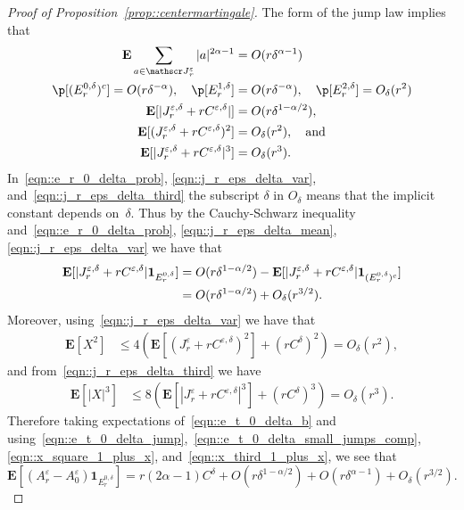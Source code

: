 \documentclass[10pt]{amsart}
\let\mathcal\mathscr
\let\epsilon\varepsilon
\theoremstyle{plain}
\numberwithin{theorem}{section}
\theoremstyle{definition}
\newcommand{\CJ}{{\mathcal J}}
\newcommand \E {{\mathbf E}}
\newcommand{\one}{{\mathbf 1}}
\begin{document}
\begin{proof}[Proof of Proposition~\ref{prop::centermartingale}]
The form of the jump law implies that
\begin{align}
\E \sum_{a \in \CJ_r^\epsilon} |a|^{2\alpha-1} &= O( r \delta^{\alpha-1}) \label{eqn::e_t_0_delta_jump}\\
\p[(E_r^{0,\delta})^c] = O(r \delta^{-\alpha}),\quad \p[E_r^{1,\delta}] &= O(r \delta^{-\alpha}),\quad \p[ E_r^{2,\delta}] = O_\delta(r^2) \label{eqn::e_r_0_delta_prob}\\
\E[ |J_r^{\epsilon,\delta} + r C^{\epsilon,\delta}| ] &= O(r \delta^{1-\alpha/2}) \label{eqn::j_r_eps_delta_mean},\\
\E[ (J_r^{\epsilon,\delta} + r C^{\epsilon,\delta})^2] &= O_\delta(r^2), \quad\text{and} \label{eqn::j_r_eps_delta_var}\\
\E[ | J_r^{\epsilon,\delta} + r C^{\epsilon,\delta} |^3] &= O_\delta(r^3). \label{eqn::j_r_eps_delta_third}
\end{align}
In~\eqref{eqn::e_r_0_delta_prob}, \eqref{eqn::j_r_eps_delta_var}, and~\eqref{eqn::j_r_eps_delta_third} the subscript $\delta$ in $O_\delta$ means that the implicit constant depends on~$\delta$. Thus by the Cauchy-Schwarz inequality and~\eqref{eqn::e_r_0_delta_prob}, \eqref{eqn::j_r_eps_delta_mean}, \eqref{eqn::j_r_eps_delta_var} we have that
\begin{align}
\E[| J_r^{\epsilon,\delta} + r C^{\epsilon,\delta} | \one_{E_r^{0,\delta}}]
&= O(r \delta^{1-\alpha/2}) - \E[ | J_r^{\epsilon,\delta} + r C^{\epsilon,\delta}| \one_{(E_r^{0,\delta})^c}] \notag\\
&= O(r \delta^{1-\alpha/2}) + O_\delta(r^{3/2}). \label{eqn::e_t_0_delta_small_jumps_comp}
\end{align}
Moreover, using~\eqref{eqn::j_r_eps_delta_var} we have that
\begin{align}
\E[ X^2]
&\leq 4\left( \E[ (J_r^\epsilon + r C^{\epsilon,\delta})^2] + (r C^\delta)^2 \right)
= O_\delta( r^2), \label{eqn::x_square_1_plus_x}
\end{align}
and from~\eqref{eqn::j_r_eps_delta_third} we have
\begin{align}
\E[|X|^3]
&\leq 8\left( \E[ | J_r^\epsilon + r C^{\epsilon,\delta}|^3] + (r C^\delta)^3 \right)
= O_\delta( r^3). \label{eqn::x_third_1_plus_x}
\end{align}
Therefore taking expectations of~\eqref{eqn::e_t_0_delta_b} and using~\eqref{eqn::e_t_0_delta_jump},~\eqref{eqn::e_t_0_delta_small_jumps_comp}, \eqref{eqn::x_square_1_plus_x}, and~\eqref{eqn::x_third_1_plus_x}, we see that
\begin{equation}
\E[ (A_r^\epsilon - A_0^\epsilon) \one_{E_r^{0,\delta}} ] = r (2\alpha-1) C^\delta + O(r \delta^{1-\alpha/2}) + O(r \delta^{\alpha-1}) + O_\delta(r^{3/2}). \label{eqn::e_t_0_delta}
\end{equation}


\end{proof}
\end{document}
